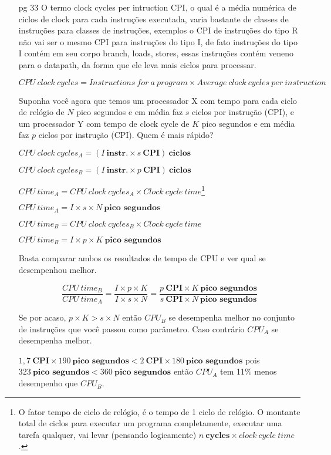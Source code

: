 \documentclass{article}
\begin{document}
\begin{enumerate}
\item[pg 33] O termo clock cycles per intruction CPI, o qual é a média numérica 
de ciclos de clock para cada instruções executada, varia bastante de classes de 
instruções para classes de instruções, exemplos o CPI de instruções do tipo R 
não vai ser o mesmo CPI para instruções do tipo I, de fato instruções do tipo I 
contém em seu corpo branch, loads, stores, essas instruções contém veneno para 
o datapath, da forma que ele leva mais ciclos para processar.

$$CPU\ clock\ cycles = Instructions\ for\ a\ program \times Average\ clock\ 
cycles\ per\ instruction$$

Suponha você agora que temos um processador X com tempo para cada ciclo de 
relógio de $N$ pico segundos e em média faz $s$ ciclos por instrução (CPI), e 
um processador Y com tempo de clock cycle de $K$ pico segundos e em média faz 
$p$ ciclos por instrução (CPI). Quem é mais rápido?

$CPU\ clock\ cycles_{A} = (I\ \textbf{instr.} \times s\ \textbf{CPI})\ 
\textbf{ciclos}$

$CPU\ clock\ cycles_{B} = (I\ \textbf{instr.} \times p\ \textbf{CPI})\ 
\textbf{ciclos}$

$CPU\ time_{A} = CPU\ clock\ cycles_{A} \times Clock\ cycle\ time$\footnote{O 
fator tempo de ciclo de relógio, é o tempo de 1 ciclo de relógio. O montante 
total de ciclos para executar um programa completamente, executar uma tarefa 
qualquer, vai levar (pensando logicamente) $n\ \textbf{cycles} \times clock\ 
cycle\ time$.}

$CPU\ time_{A} = I \times s \times N\ \textbf{pico segundos}$

$CPU\ time_{B} = CPU\ clock\ cycles_{B} \times Clock\ cycle\ time$

$CPU\ time_{B} = I \times p \times K\ \textbf{pico segundos}$

Basta comparar ambos os resultados de tempo de CPU e ver qual se desempenhou 
melhor.

$$\frac{CPU\ time_{B}}{CPU\ time_{A}} = \frac{I \times p \times K}{I \times s 
\times N} = \frac{p\ \textbf{CPI} \times K\ \textbf{pico segundos}}{s\ 
\textbf{CPI} \times N\ \textbf{pico segundos}}$$

Se por acaso, $p \times K > s \times N$ então $CPU_{B}$ se desempenha melhor no 
conjunto de instruções que você passou como parâmetro. Caso contrário $CPU_{A}$ 
se desempenha melhor.

$1,7\ \textbf{CPI} \times 190\ \textbf{pico segundos} < 2\ \textbf{CPI} \times 
180\ \textbf{pico segundos}$ pois $323\ \textbf{pico segundos}  < 360\ 
\textbf{pico segundos}$ então $CPU_{A}$ tem 11\% menos desempenho que $CPU_{B}$.


\end{enumerate}
\end{document}
